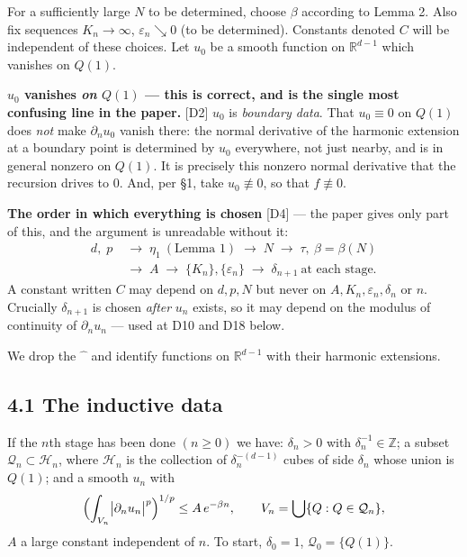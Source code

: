 \documentclass[11pt,reqno]{amsart}
\theoremstyle{plain}
\theoremstyle{definition}
\theoremstyle{plain}
\theoremstyle{definition}
\theoremstyle{remark}
\newcommand{\Rdm}{\mathbb{R}^{d-1}}
\newcommand{\nd}{\partial_n}
\newcommand{\Ledger}[1]{{\scriptsize\textsf{[#1]}}}
\begin{document}
For a sufficiently large $N$ to be determined, choose $\beta$ according to Lemma 2.
Also fix sequences $K_n\to\infty$, $\varepsilon_n\searrow0$ (to be determined).
Constants denoted $C$ will be independent of these choices. Let $u_0$ be a smooth
function on $\Rdm$ which vanishes on $Q(1)$.

\begin{filled}
\textbf{$u_0$ vanishes \emph{on} $Q(1)$ --- this is correct, and is the single most
confusing line in the paper.} \Ledger{D2} $u_0$ is \emph{boundary data}. That
$u_0\equiv0$ on $Q(1)$ does \emph{not} make $\nd u_0$ vanish there: the normal
derivative of the harmonic extension at a boundary point is determined by $u_0$
everywhere, not just nearby, and is in general nonzero on $Q(1)$. It is precisely
this nonzero normal derivative that the recursion drives to $0$. And, per \S1, take
$u_0\not\equiv0$, so that $f\not\equiv0$.
\end{filled}

\begin{ournotation}
\textbf{The order in which everything is chosen} \Ledger{D4} --- the paper gives
only part of this, and the argument is unreadable without it:
\[
 \begin{aligned}
  d,\;p \;&\longrightarrow\; \eta_1\ (\text{Lemma 1})
  \;\longrightarrow\; N \;\longrightarrow\; \tau,\ \beta=\beta(N)\\
  \;&\longrightarrow\; A \;\longrightarrow\; \{K_n\},\{\varepsilon_n\}
  \;\longrightarrow\; \delta_{n+1}\ \text{at each stage.}
 \end{aligned}
\]
A constant written $C$ may depend on $d,p,N$ but never on
$A,K_n,\varepsilon_n,\delta_n$ or $n$. Crucially $\delta_{n+1}$ is chosen
\emph{after} $u_n$ exists, so it may depend on the modulus of continuity of
$\nd u_n$ --- used at D10 and D18 below.
\end{ournotation}

We drop the $\widehat{\phantom{x}}$ and identify functions on $\Rdm$ with their
harmonic extensions.

\subsection*{4.1 The inductive data}

If the $n$th stage has been done $(n\ge0)$ we have: $\delta_n>0$ with
$\delta_n^{-1}\in\mathbb Z$; a subset $\mathcal Q_n\subset\mathcal H_n$, where
$\mathcal H_n$ is the collection of $\delta_n^{-(d-1)}$ cubes of side $\delta_n$
whose union is $Q(1)$; and a smooth $u_n$ with
\begin{equation}\label{eq:IH}
 \Bigl(\int_{V_n}\bigl|\nd u_n\bigr|^p\Bigr)^{1/p}\le A\,e^{-\beta n},
 \qquad V_n=\bigcup\{Q:Q\in\mathcal Q_n\},
\end{equation}
$A$ a large constant independent of $n$. To start, $\delta_0=1$,
$\mathcal Q_0=\{Q(1)\}$.
\end{document}
